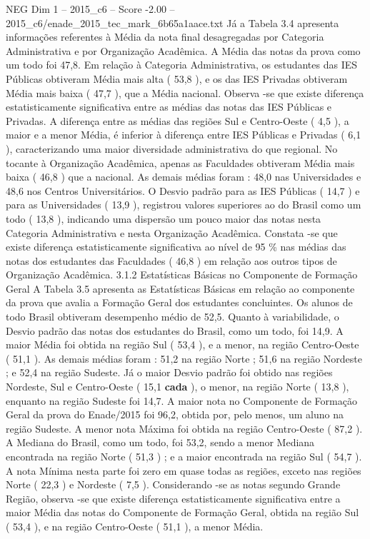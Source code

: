 \begin{textsample}{NEG Dim 1 – 2015\_c6 – Score -2.00 – 2015\_c6/enade\_2015\_tec\_mark\_6b65a1aace.txt}
Já a Tabela 3.4 apresenta informações referentes à Média da nota final desagregadas por Categoria Administrativa e por Organização Acadêmica.
A Média das notas da prova como um todo foi 47,8.
Em relação à Categoria Administrativa, os estudantes das IES Públicas obtiveram Média mais alta ( 53,8 ), e os das IES Privadas obtiveram Média mais baixa ( 47,7 ), que a Média nacional.
Observa -se que existe diferença estatisticamente significativa entre as médias das notas das IES Públicas e Privadas.
A diferença entre as médias das regiões Sul e Centro-Oeste ( 4,5 ), a maior e a menor Média, é inferior à diferença entre IES Públicas e Privadas ( 6,1 ), caracterizando uma maior diversidade administrativa do que regional.
No tocante à Organização Acadêmica, apenas as Faculdades obtiveram Média mais baixa ( 46,8 ) que a nacional.
As demais médias foram : 48,0 nas Universidades e 48,6 nos Centros Universitários.
O Desvio padrão para as IES Públicas ( 14,7 ) e para as Universidades ( 13,9 ), registrou valores superiores ao do Brasil como um todo ( 13,8 ), indicando uma dispersão um pouco maior das notas nesta Categoria Administrativa e nesta Organização Acadêmica.
Constata -se que existe diferença estatisticamente significativa ao nível de 95 \% nas médias das notas dos estudantes das Faculdades ( 46,8 ) em relação aos outros tipos de Organização Acadêmica. 3.1.2 Estatísticas Básicas no Componente de Formação Geral A Tabela 3.5 apresenta as Estatísticas Básicas em relação ao componente da prova que avalia a Formação Geral dos estudantes concluintes.
Os alunos de todo Brasil obtiveram desempenho médio de 52,5.
Quanto à variabilidade, o Desvio padrão das notas dos estudantes do Brasil, como um todo, foi 14,9.
A maior Média foi obtida na região Sul ( 53,4 ), e a menor, na região Centro-Oeste ( 51,1 ).
As demais médias foram : 51,2 na região Norte ; 51,6 na região Nordeste ; e 52,4 na região Sudeste.
Já o maior Desvio padrão foi obtido nas regiões Nordeste, Sul e Centro-Oeste ( 15,1 \textbf{cada} ), o menor, na região Norte ( 13,8 ), enquanto na região Sudeste foi 14,7.
A maior nota no Componente de Formação Geral da prova do Enade/2015 foi 96,2, obtida por, pelo menos, um aluno na região Sudeste.
A menor nota Máxima foi obtida na região Centro-Oeste ( 87,2 ).
A Mediana do Brasil, como um todo, foi 53,2, sendo a menor Mediana encontrada na região Norte ( 51,3 ) ; e a maior encontrada na região Sul ( 54,7 ).
A nota Mínima nesta parte foi zero em quase todas as regiões, exceto nas regiões Norte ( 22,3 ) e Nordeste ( 7,5 ).
Considerando -se as notas segundo Grande Região, observa -se que existe diferença estatisticamente significativa entre a maior Média das notas do Componente de Formação Geral, obtida na região Sul ( 53,4 ), e na região Centro-Oeste ( 51,1 ), a menor Média.

\end{textsample}
